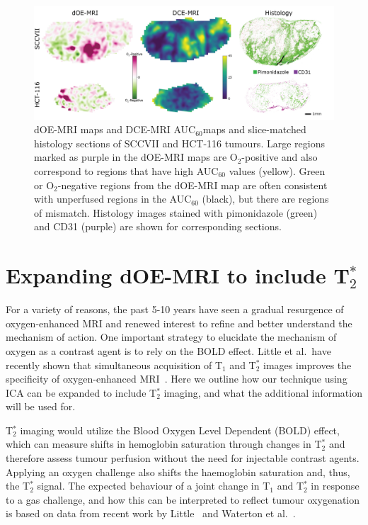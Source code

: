 \begin{figure}[htbp]
   \centering
   \includegraphics[width=\textwidth]{futurework/futurework-images/fig_perfusion.png} %
   \caption{\ac{dOE-MRI} maps and DCE-MRI \acs{AUC}$_{60}$maps and slice-matched histology sections of SCCVII and HCT-116 tumours. Large regions marked as purple in the \ac{dOE-MRI} maps are O$_2$-positive and also correspond to regions that have high \acs{AUC}$_{60}$ values (yellow). Green or O$_2$-negative regions from the \acs{dOE-MRI} map are often consistent with unperfused regions in the \acs{AUC}$_{60}$ (black), but there are regions of mismatch. Histology images stained with pimonidazole (green) and CD31 (purple) are shown for corresponding sections.
   \label{fig_perfusion}}
\end{figure}

\section{Expanding \texorpdfstring{\acs{dOE-MRI}}{dOE-MRI} to include \texorpdfstring{T$_2^*$}{T2*}}
\label{futurework:expandingdOEMRI_T2*}

For a variety of reasons, the past 5-10 years have seen a gradual resurgence of oxygen-enhanced MRI and renewed interest to refine and better understand the mechanism of action.
One important strategy to elucidate the mechanism of oxygen as a contrast agent is to rely on the \acs{BOLD} effect. 
Little et al.\ have recently shown that simultaneous acquisition of T$_1$ and T$_2^*$ images improves the specificity of oxygen-enhanced MRI~\cite{Little:2018iu}.
Here we outline how our technique using \acs{ICA} can be expanded to include T$_2^*$ imaging, and what the additional information will be used for.

T$_2^*$ imaging would utilize the Blood Oxygen Level Dependent (\acs{BOLD}) effect, which can measure shifts in hemoglobin saturation through changes in T$_2^*$ and therefore assess tumour perfusion without the need for injectable contrast agents. 
Applying an oxygen challenge also shifts the haemoglobin saturation and, thus, the T$_2^*$ signal. 
The expected behaviour of a joint change in T$_1$ and T$_2^*$ in response to a gas challenge, and how this can be interpreted to reflect tumour oxygenation is based on data from recent work by Little~\cite{Little:2018iu} and Waterton et al.~\cite{OConnor:2019fc}. 

